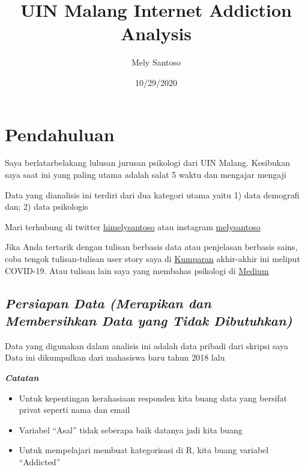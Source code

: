 \documentclass[
]{article}
\title{UIN Malang Internet Addiction Analysis}
\author{Mely Santoso}
\date{10/29/2020}
\providecommand{\tightlist}{%
  \setlength{\itemsep}{0pt}\setlength{\parskip}{0pt}}
\begin{document}
\maketitle

\hypertarget{pendahuluan}{%
\section{\texorpdfstring{\textbf{Pendahuluan}}{Pendahuluan}}\label{pendahuluan}}

Saya berlatarbelakang lulusan jurusan psikologi dari UIN Malang.
Kesibukan saya saat ini yang paling utama adalah salat 5 waktu dan
mengajar mengaji

Data yang dianalisis ini terdiri dari dua kategori utama yaitu 1) data
demografi dan; 2) data psikologis

Mari terhubung di twitter
\href{https://twitter.com/himelysantoso}{himelysantoso} atau instagram
\href{https://www.instagram.com/melysantoso/}{melysantoso}

Jika Anda tertarik dengan tulisan berbasis data atau penjelasan berbasis
sains, coba tengok tulisan-tulisan user story saya di
\href{https://kumparan.com/melysantoso}{Kumparan} akhir-akhir ini
meliput COVID-19. Atau tulisan lain saya yang membahas psikologi di
\href{https://medium.com/@bukakurung}{Medium}

\hypertarget{persiapan-data-merapikan-dan-membersihkan-data-yang-tidak-dibutuhkan}{%
\subsection{\texorpdfstring{\emph{Persiapan Data (Merapikan dan
Membersihkan Data yang Tidak
Dibutuhkan)}}{Persiapan Data (Merapikan dan Membersihkan Data yang Tidak Dibutuhkan)}}\label{persiapan-data-merapikan-dan-membersihkan-data-yang-tidak-dibutuhkan}}

Data yang digunakan dalam analisis ini adalah data pribadi dari skripsi
saya Data ini dikumpulkan dari mahasiswa baru tahun 2018 lalu

\textbf{\emph{Catatan}}

\begin{itemize}
\tightlist
\item
  Untuk kepentingan kerahasiaan responden kita buang data yang bersifat
  privat seperti nama dan email
\item
  Variabel ``Asal'' tidak seberapa baik datanya jadi kita buang
\item
  Untuk mempelajari membuat kategorisasi di R, kita buang variabel
  ``Addicted''
\end{itemize}
\end{document}
